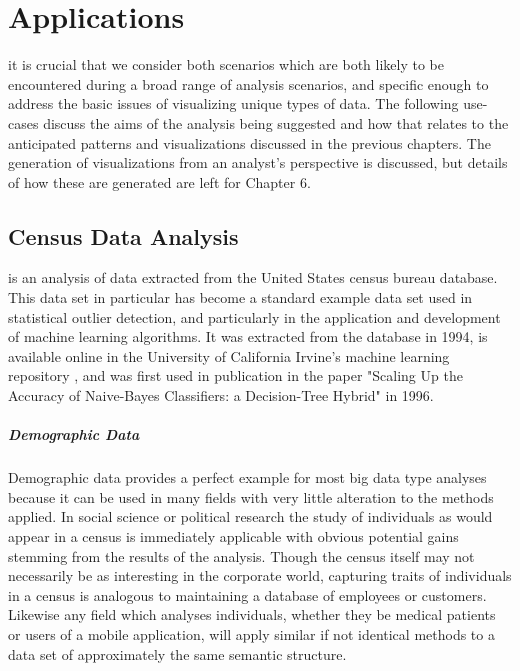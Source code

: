\chapter{Applications}
\label{sec:applications}
 it is crucial that we consider both scenarios which are both likely to be encountered during a broad range of analysis scenarios, and specific enough to address the basic issues of visualizing unique types of data. The following use-cases discuss the aims of the analysis being suggested and how that relates to the anticipated patterns and visualizations discussed in the previous chapters. The generation of visualizations from an analyst's perspective is discussed, but details of how these are generated are left for Chapter 6.

\section{Census Data Analysis}
\label{sec:census}
 is an analysis of data extracted from the United States census bureau database. This data set in particular has become a standard example data set used in statistical outlier detection, and particularly in the application and development of machine learning algorithms. It was extracted from the database in 1994, is available online in the University of California Irvine's machine learning repository \cite{Blake1998}, and was first used in publication in the paper "Scaling Up the Accuracy of Naive-Bayes Classifiers: a Decision-Tree Hybrid"\cite{Kohavi1996} in 1996. 

\paragraph{Demographic Data}
Demographic data provides a perfect example for most big data type analyses because it can be used in many fields with very little alteration to the methods applied. In social science or political research the study of individuals as would appear in a census is immediately applicable with obvious potential gains stemming from the results of the  analysis. Though the census itself may not necessarily be as interesting in the corporate world, capturing traits of individuals in a census is analogous to maintaining a database of employees or customers. Likewise any field which analyses individuals, whether they be medical patients or users of a mobile application, will apply similar if not identical methods to a data set of approximately the same semantic structure. 


